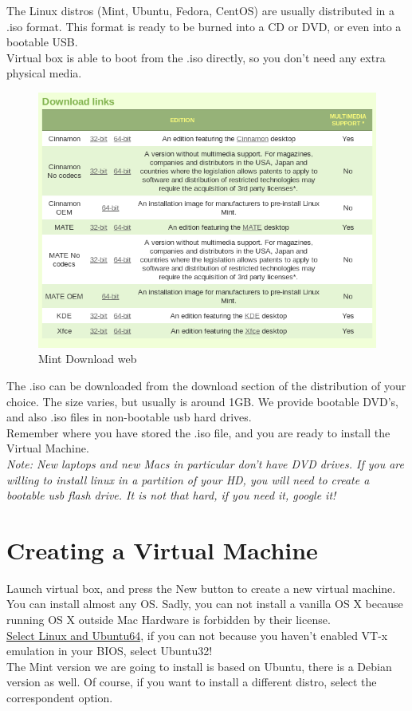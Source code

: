 \documentclass[a4paper]{article}
\begin{document}
The Linux distros (Mint, Ubuntu, Fedora, CentOS) are usually distributed in a .iso format. This format is ready to be burned into a CD or DVD, or even into a bootable USB.\\
Virtual box is able to boot from the .iso directly, so you don't need any extra physical media.\\
\begin{figure}[H]
    \centering
    \includegraphics[width=0.5\linewidth]{mintDownload.png}
    \caption{Mint Download web}
    \label{fig:mintDownload}
\end{figure}

The .iso can be downloaded from the download section of the distribution of your choice. The size varies, but usually is around 1GB. We provide bootable DVD's, and also .iso files in non-bootable usb hard drives.\\
Remember where you have stored the .iso file, and you are ready to install the Virtual Machine.\\

\textit{Note: New laptops and new Macs in particular don't have DVD drives. If you are willing to install linux in a partition of your HD, you will need to create a bootable usb flash drive. It is not that hard, if you need it, google it!}

\section{Creating a Virtual Machine}
Launch virtual box, and press the New button to create a new virtual machine. You can install almost any OS.  Sadly, you can not install a vanilla OS X because running OS X outside Mac Hardware is forbidden by their license.\\

\noindent
\hyperref[fig:VBCreation]{Select Linux and Ubuntu64}, if you can not because you haven't enabled VT-x emulation in your BIOS, select Ubuntu32!\\
The Mint version we are going to install is based on Ubuntu, there is a Debian version as well. Of course, if you want to install a different distro, select the correspondent option.\\
\end{document}
